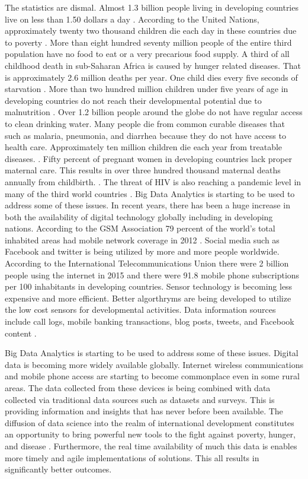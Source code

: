 \documentclass[sigconf]{acmart}
\begin{document}
The statistics are dismal. Almost 1.3 billion people living in developing countries live on less than 1.50 dollars a day \cite{www-google-top5}.  According to the United Nations, approximately twenty two thousand children die each day in these countries due to poverty \cite{www-google-top10}.   More than eight hundred seventy million people of the entire third population have no food to eat or a very precarious food supply. A third of all childhood death in sub-Saharan Africa is caused by hunger related diseases. That is approximately 2.6 million deaths per year. One child dies every five seconds of starvation \cite{www-google-top10}. More than two hundred million children under five years of age in developing countries do not reach their developmental potential due to malnutrition \cite{www-google-WikiDevC}.  Over 1.2 billion people around the globe do not have regular access to clean drinking water. Many people die from common curable diseases that such as malaria, pneumonia, and diarrhea because they do not have access to health care. Approximately ten million children die each year from treatable diseases. \cite{www-google-top5}.  Fifty percent of pregnant women in developing countries lack proper maternal care. This results in over three hundred thousand maternal deaths annually from childbirth.  \cite{www-google-top10}. The threat of HIV is also reaching a pandemic level in many of the third world countries \cite{www-google-top5}.
Big Data Analytics is starting to be used to address some of these issues. In recent years, there has been a huge increase in both the availability of digital technology globally including in developing nations. According to the GSM Association 79 percent of the world’s total inhabited areas had mobile network coverage in 2012 \cite{DevEcon}.  Social media such as Facebook and twitter is being utilized by more and more people worldwide. According to the International Telecommunications Union there were 2 billion people using the internet in 2015 and there were 91.8 mobile phone subscriptions per 100 inhabitants in developing countries.  Sensor technology is becoming less expensive and more efficient. Better algorthryms are being developed to utilize the low cost sensors for developmental activities. Data information sources include call logs, mobile banking transactions, blog posts, tweets, and Facebook content \cite{www-google-GloPls}.

Big Data Analytics is starting to be used to address some of these issues. Digital data is becoming more widely available globally. Internet wireless communications and mobile phone access are starting to become commonplace even in some rural areas. The data collected from these devices is being combined with data collected via traditional data sources such as datasets and surveys. This is providing information and insights that has never before been available. The diffusion of data science into the realm of international development constitutes an opportunity to bring powerful new tools to the fight against poverty, hunger, and disease \cite{www-google-GloPls}. Furthermore, the real time availability of much this data is  enables more timely and agile implementations of solutions. This all results in significantly better outcomes.
\end{document}
